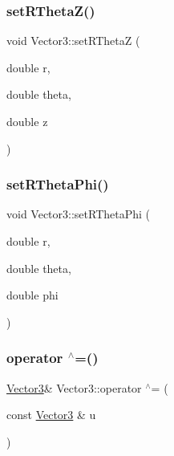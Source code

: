 \mbox{\label{class_vector3_ad92ad388f1fb1d35c4efbd53d2c00776}} 
\subsubsection{\texorpdfstring{setRThetaZ()}{setRThetaZ()}}
{\footnotesize\ttfamily void Vector3\+::set\+R\+ThetaZ (\begin{DoxyParamCaption}\item[{double}]{r,  }\item[{double}]{theta,  }\item[{double}]{z }\end{DoxyParamCaption})\hspace{0.3cm}{\ttfamily [inline]}}

\mbox{\label{class_vector3_a8f5b7f22c561c335017ad3a76bcd1808}} 
\subsubsection{\texorpdfstring{setRThetaPhi()}{setRThetaPhi()}}
{\footnotesize\ttfamily void Vector3\+::set\+R\+Theta\+Phi (\begin{DoxyParamCaption}\item[{double}]{r,  }\item[{double}]{theta,  }\item[{double}]{phi }\end{DoxyParamCaption})\hspace{0.3cm}{\ttfamily [inline]}}

\mbox{\label{class_vector3_a2f9f8d7b5cd54c6a78a2a8930d075926}} 
\subsubsection{\texorpdfstring{operator $^\wedge$=()}{operator ^=()}}
{\footnotesize\ttfamily \mbox{\hyperlink{class_vector3}{Vector3}}\& Vector3\+::operator $^\wedge$= (\begin{DoxyParamCaption}\item[{const \mbox{\hyperlink{class_vector3}{Vector3}} \&}]{u }\end{DoxyParamCaption})\hspace{0.3cm}{\ttfamily [inline]}}


